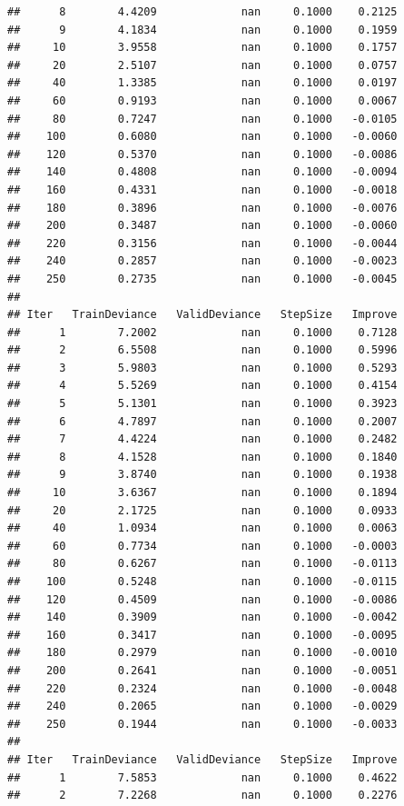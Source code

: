 \documentclass[]{book}
\begin{document}
\begin{verbatim}
##      8        4.4209             nan     0.1000    0.2125
##      9        4.1834             nan     0.1000    0.1959
##     10        3.9558             nan     0.1000    0.1757
##     20        2.5107             nan     0.1000    0.0757
##     40        1.3385             nan     0.1000    0.0197
##     60        0.9193             nan     0.1000    0.0067
##     80        0.7247             nan     0.1000   -0.0105
##    100        0.6080             nan     0.1000   -0.0060
##    120        0.5370             nan     0.1000   -0.0086
##    140        0.4808             nan     0.1000   -0.0094
##    160        0.4331             nan     0.1000   -0.0018
##    180        0.3896             nan     0.1000   -0.0076
##    200        0.3487             nan     0.1000   -0.0060
##    220        0.3156             nan     0.1000   -0.0044
##    240        0.2857             nan     0.1000   -0.0023
##    250        0.2735             nan     0.1000   -0.0045
## 
## Iter   TrainDeviance   ValidDeviance   StepSize   Improve
##      1        7.2002             nan     0.1000    0.7128
##      2        6.5508             nan     0.1000    0.5996
##      3        5.9803             nan     0.1000    0.5293
##      4        5.5269             nan     0.1000    0.4154
##      5        5.1301             nan     0.1000    0.3923
##      6        4.7897             nan     0.1000    0.2007
##      7        4.4224             nan     0.1000    0.2482
##      8        4.1528             nan     0.1000    0.1840
##      9        3.8740             nan     0.1000    0.1938
##     10        3.6367             nan     0.1000    0.1894
##     20        2.1725             nan     0.1000    0.0933
##     40        1.0934             nan     0.1000    0.0063
##     60        0.7734             nan     0.1000   -0.0003
##     80        0.6267             nan     0.1000   -0.0113
##    100        0.5248             nan     0.1000   -0.0115
##    120        0.4509             nan     0.1000   -0.0086
##    140        0.3909             nan     0.1000   -0.0042
##    160        0.3417             nan     0.1000   -0.0095
##    180        0.2979             nan     0.1000   -0.0010
##    200        0.2641             nan     0.1000   -0.0051
##    220        0.2324             nan     0.1000   -0.0048
##    240        0.2065             nan     0.1000   -0.0029
##    250        0.1944             nan     0.1000   -0.0033
## 
## Iter   TrainDeviance   ValidDeviance   StepSize   Improve
##      1        7.5853             nan     0.1000    0.4622
##      2        7.2268             nan     0.1000    0.2276

\end{verbatim}
\end{document}
